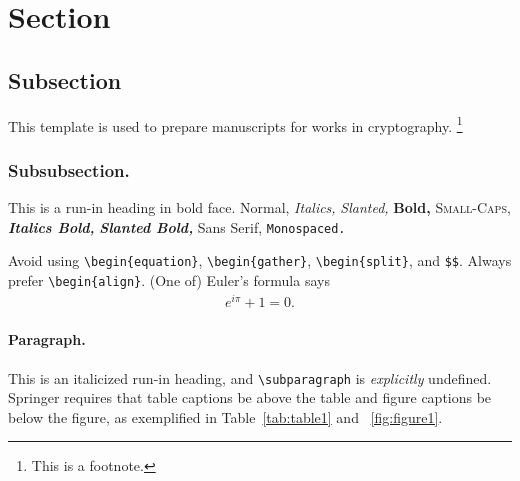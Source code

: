 \section{Section}

\subsection{Subsection}

This template is used to prepare manuscripts for works in cryptography.%
\footnote{This is a footnote.}

\subsubsection{Subsubsection.}
This is a run-in heading in bold face.
Normal,
\textit{Italics,}
\textsl{Slanted,}
\textbf{Bold,}
\textsc{Small-Caps,}
\textit{\textbf{Italics Bold,}}
\textsl{\textbf{Slanted Bold,}}
\textsf{Sans Serif,}
\texttt{Monospaced.}

Avoid using \texttt{\textbackslash begin\{equation\}},
\texttt{\textbackslash begin\{gather\}},
\texttt{\textbackslash begin\{split\}},
and \texttt{\$\$}.
Always prefer \texttt{\textbackslash begin\{align\}}.
(One of) Euler's formula says
\begin{align*}
e^{i\pi}+1=0.
\end{align*}

\paragraph{Paragraph.}
This is an italicized run-in heading, and
\texttt{\textbackslash subparagraph} is \emph{explicitly} undefined.
Springer requires that table captions be above the table
and figure captions be below the figure,
as exemplified in Table~\ref{tab:table1} and \Figure~\ref{fig:figure1}.

